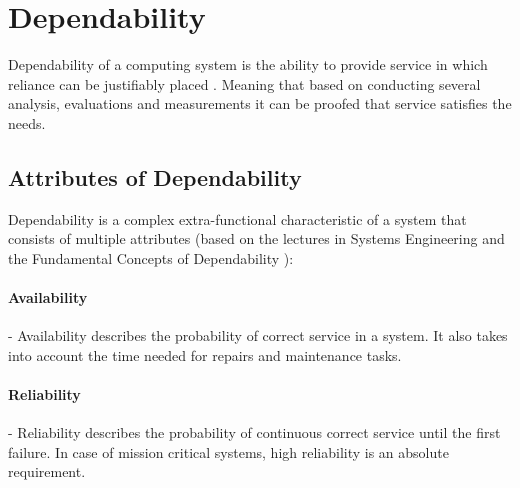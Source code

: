 

\section{Dependability}

Dependability of a computing system is the ability to provide service in which reliance can be justifiably placed \cite{DependabilityBMEMIT}. Meaning that based on conducting several analysis, evaluations and measurements it can be proofed that service satisfies the needs.

\subsection{Attributes of Dependability} \label{dependability-attributes}

Dependability is a complex extra-functional characteristic of a system that consists of multiple attributes (based on the lectures in Systems Engineering \cite{DependabilityBMEMIT} and the Fundamental Concepts of Dependability \cite{FundamentalConceptsOfDependability}):

\paragraph{Availability}- Availability describes the probability of correct service in a system. It also takes into account the time needed for repairs and maintenance tasks.

\paragraph{Reliability}- Reliability describes the probability of continuous correct service until the first failure. In case of mission critical systems, high reliability is an absolute requirement.

